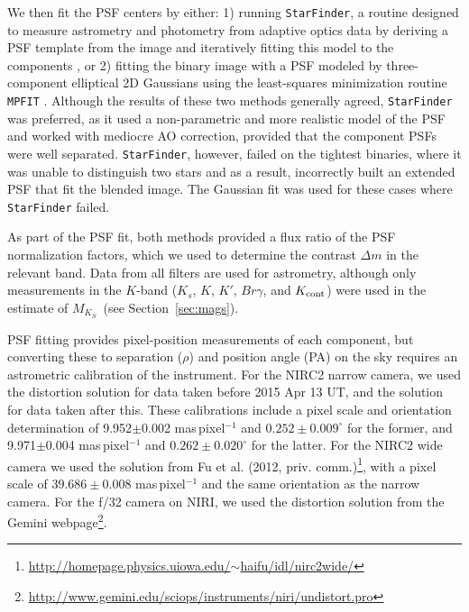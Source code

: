 \documentclass[twocolumn]{aastex62}
\newcommand{\mks}{$M_{K_S}$}
\begin{document}
We then fit the PSF centers by either: 1) running {\tt StarFinder}, a routine designed to measure astrometry and photometry from adaptive optics data by deriving a PSF template from the image and iteratively fitting this model to the components \citep[for more details, see][]{2000A&AS..147..335D}, or 2) fitting the binary image with a PSF modeled by three-component elliptical 2D Gaussians using the least-squares minimization routine {\tt MPFIT} \citep{Markwart2009}. Although the results of these two methods generally agreed, {\tt StarFinder} was preferred, as it used a non-parametric and more realistic model of the PSF and worked with mediocre AO correction, provided that the component PSFs were well separated. {\tt StarFinder}, however, failed on the tightest binaries, where it was unable to distinguish two stars and as a result, incorrectly built an extended PSF that fit the blended image. The Gaussian fit was used for these cases where {\tt StarFinder} failed. 

As part of the PSF fit, both methods provided a flux ratio of the PSF normalization factors, which we used to determine the contrast $\Delta m$ in the relevant band. Data from all filters are used for astrometry, although only measurements in the $K$-band ($K_s$, $K$, $K'$, $Br\gamma$, and $K_{\rm{cont}}$) were used in the estimate of \mks\ (see Section~\ref{sec:mags}).

PSF fitting provides pixel-position measurements of each component, but converting these to separation ($\rho$) and position angle (PA) on the sky requires an astrometric calibration of the instrument. For the NIRC2 narrow camera, we used the \citet{Yelda2010} distortion solution for data taken before 2015 Apr 13 UT, and the \citet{2016PASP..128i5004S} solution for data taken after this. These calibrations include a pixel scale and orientation determination of 9.952$\pm$0.002 mas\,pixel$^{-1}$ and $0.252\pm0.009^{\circ}$ for the former, and 9.971$\pm$0.004 mas\,pixel$^{-1}$ and $0.262\pm0.020^{\circ}$ for the latter. For the NIRC2 wide camera we used the solution from Fu et al. (2012, priv. comm.)\footnote{\href{http://homepage.physics.uiowa.edu/~haifu/idl/nirc2wide/}{http://homepage.physics.uiowa.edu/$\sim$haifu/idl/nirc2wide/}}, with a pixel scale of $39.686\pm0.008$ mas\,pixel$^{-1}$ and the same orientation as the narrow camera. For the f/32 camera on NIRI, we used the distortion solution from the Gemini webpage\footnote{\href{http://www.gemini.edu/sciops/instruments/niri/undistort.pro}{http://www.gemini.edu/sciops/instruments/niri/undistort.pro}}. 
\end{document}
